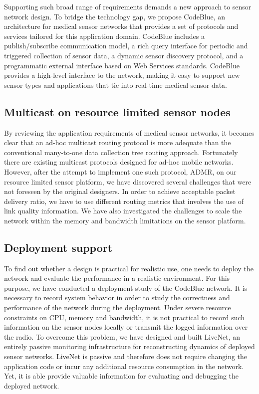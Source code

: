 Supporting such broad range of requirements demands a new approach to
sensor network design. To bridge the technology gap, we propose CodeBlue, an
architecture for medical sensor networks that provides a set of protocols and
services tailored for this application domain. CodeBlue includes
a publish/subscribe communication model, a rich query interface for periodic
and triggered collection of sensor data, a dynamic sensor discovery protocol,
and a programmatic external interface based on Web Services standards.
CodeBlue provides a high-level interface to the network, making it easy to
support new sensor types and applications that tie into real-time medical
sensor data.

\subsection{Multicast on resource limited sensor nodes}

By reviewing the application requirements of medical sensor networks, it
becomes clear that an ad-hoc multicast routing protocol is more adequate
than the conventional many-to-one data collection tree routing approach.
Fortunately there are existing multicast protocols designed for ad-hoc mobile
networks. However, after the attempt to implement one such protocol, ADMR, on
our resource limited sensor platform, we have discovered several challenges
that were not foreseen by the original designers. In order to achieve
acceptable packet delivery ratio, we have to use different routing metrics that
involves the use of link quality information. We have also
investigated the challenges to scale the network within the memory and
bandwidth limitations on the sensor platform.

\subsection{Deployment support}

To find out whether a design is practical for realistic use, one needs to
deploy the network and evaluate the performance in a realistic environment.
For this purpose, we have conducted a deployment study of the CodeBlue
network. It is necessary to record system behavior in order to study
the correctness and performance of the network during the deployment. Under severe
resource constraints on CPU, memory and bandwidth, it is not practical to
record such information on the sensor nodes locally or transmit the logged
information over the radio. To overcome this problem, we have designed and
built LiveNet, an entirely passive monitoring infrastructure for
reconstructing dynamics of deployed sensor networks.  LiveNet is passive and
therefore does not require changing the application code or incur any
additional resource consumption in the network. Yet, it is able provide
valuable information for evaluating and debugging the deployed network.

